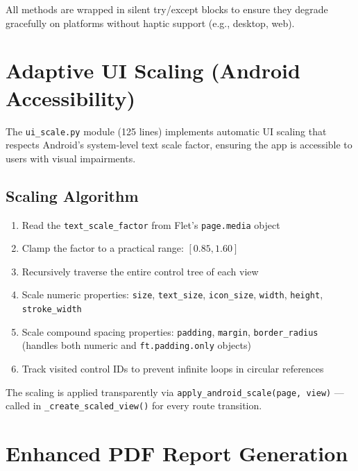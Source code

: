 \documentclass[12pt,a4paper]{article}
\begin{document}
All methods are wrapped in silent try/except blocks to ensure they degrade gracefully on platforms without haptic support (e.g., desktop, web).

\section{Adaptive UI Scaling (Android Accessibility)}

The \texttt{ui\_scale.py} module (125 lines) implements automatic UI scaling that respects Android's system-level text scale factor, ensuring the app is accessible to users with visual impairments.

\subsection{Scaling Algorithm}

\begin{enumerate}[leftmargin=2em]
    \item Read the \texttt{text\_scale\_factor} from Flet's \texttt{page.media} object
    \item Clamp the factor to a practical range: $[0.85, 1.60]$
    \item Recursively traverse the entire control tree of each view
    \item Scale numeric properties: \texttt{size}, \texttt{text\_size}, \texttt{icon\_size}, \texttt{width}, \texttt{height}, \texttt{stroke\_width}
    \item Scale compound spacing properties: \texttt{padding}, \texttt{margin}, \texttt{border\_radius} (handles both numeric and \texttt{ft.padding.only} objects)
    \item Track visited control IDs to prevent infinite loops in circular references
\end{enumerate}

The scaling is applied transparently via \texttt{apply\_android\_scale(page, view)} — called in \texttt{\_create\_scaled\_view()} for every route transition.

\section{Enhanced PDF Report Generation}
\end{document}
